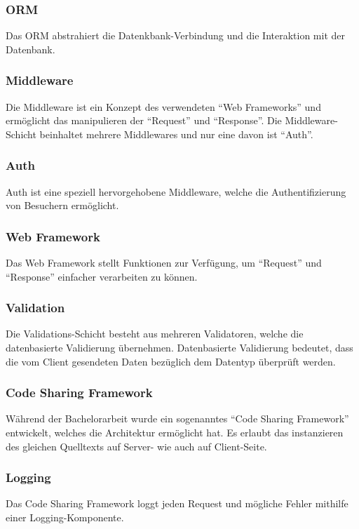 \subsubsection*{ORM}
Das ORM abstrahiert die Datenkbank-Verbindung und die Interaktion mit der Datenbank.

\subsubsection*{\gls{Middleware}}
Die \gls{Middleware} ist ein Konzept des verwendeten ``Web Frameworks'' und ermöglicht das manipulieren der ``Request'' und ``Response''.
Die Middleware-Schicht beinhaltet mehrere Middlewares und nur eine davon ist ``Auth''.

\subsubsection*{Auth}
Auth ist eine speziell hervorgehobene Middleware, welche die Authentifizierung von Besuchern ermöglicht.

\subsubsection*{Web Framework}
Das Web Framework stellt Funktionen zur Verfügung, um ``Request'' und ``Response'' einfacher verarbeiten zu können.

\subsubsection*{Validation}
Die Validations-Schicht besteht aus mehreren Validatoren, welche die datenbasierte Validierung übernehmen. Datenbasierte Validierung bedeutet, dass die vom Client gesendeten Daten bezüglich dem Datentyp überprüft werden.

\subsubsection*{Code Sharing Framework}
Während der Bachelorarbeit wurde ein sogenanntes ``Code Sharing Framework'' entwickelt, welches die Architektur ermöglicht hat. Es erlaubt das instanzieren des gleichen Quelltexts auf Server- wie auch auf Client-Seite.

\subsubsection*{Logging}
Das Code Sharing Framework loggt jeden Request und mögliche Fehler mithilfe einer Logging-Komponente.

